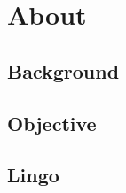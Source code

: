 \section{About}

\subsection{Background}
\frameready{
	
}

\subsection{Objective}
\frameready{
	
	
}

\subsection{Lingo}
\frameready{
	
	
}